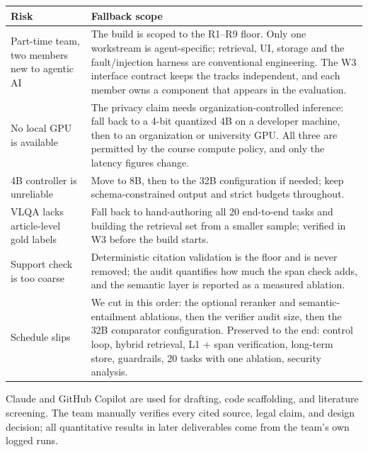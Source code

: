 \vspace{3pt}
{\small
\noindent
\begin{tabularx}{\textwidth}{@{} >{\raggedright\arraybackslash}p{3.2cm} X @{}}
\toprule
\textbf{Risk} & \textbf{Fallback scope} \\
\midrule
Part-time team, two members new to agentic AI & The build is scoped to the R1--R9 floor. Only one workstream is agent-specific; retrieval, UI, storage and the fault/injection harness are conventional engineering. The W3 interface contract keeps the tracks independent, and each member owns a component that appears in the evaluation. \\
No local GPU is available & The privacy claim needs organization-controlled inference: fall back to a 4-bit quantized 4B on a developer machine, then to an organization or university GPU. All three are permitted by the course compute policy, and only the latency figures change. \\
4B controller is unreliable & Move to 8B, then to the 32B configuration if needed; keep schema-constrained output and strict budgets throughout. \\
VLQA lacks article-level gold labels & Fall back to hand-authoring all 20 end-to-end tasks and building the retrieval set from a smaller sample; verified in W3 before the build starts. \\
Support check is too coarse & Deterministic citation validation is the floor and is never removed; the audit quantifies how much the span check adds, and the semantic layer is reported as a measured ablation. \\
Schedule slips & We cut in this order: the optional reranker and semantic-entailment ablations, then the verifier audit size, then the 32B comparator configuration. Preserved to the end: control loop, hybrid retrieval, L1 + span verification, long-term store, guardrails, 20 tasks with one ablation, security analysis. \\
\bottomrule
\end{tabularx}
}

Claude and GitHub Copilot are used for drafting, code scaffolding, and literature screening. The team manually verifies every cited source, legal claim, and design decision; all quantitative results in later deliverables come from the team's own logged runs.
